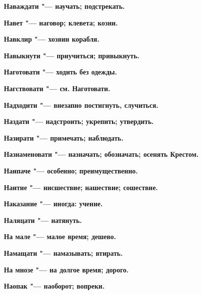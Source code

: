 \begin{multicols}{2}
\bfseries Наваждати\normalfont{} "--- научать; подстрекать. 




\bfseries Навет\normalfont{} "--- наговор; клевета; козни. 




\bfseries Навклир\normalfont{} "--- хозяин корабля. 




\bfseries Навыкнути\normalfont{} "--- приучиться; привыкнуть. 




\bfseries Наготовати\normalfont{} "--- ходить без одежды. 




\bfseries Нагствовати\normalfont{} "--- см. Наготовати. 




\bfseries Надходити\normalfont{} "--- внезапно постигнуть, случиться. 




\bfseries Наздати\normalfont{} "--- надстроить; укрепить; утвердить. 




\bfseries Назирати\normalfont{} "--- примечать; наблюдать. 




\bfseries Назнаменовати\normalfont{} "--- назначать; обозначать; осенять Крестом. 




\bfseries Наипаче\normalfont{} "--- особенно; преимущественно. 




\bfseries Наитие\normalfont{} "--- нисшествие; нашествие; сошествие. 




\bfseries Наказание\normalfont{} "--- иногда: учение. 




\bfseries Наляцати\normalfont{} "--- натянуть. 




\bfseries На мале\normalfont{} "--- малое время; дешево. 




\bfseries Намащати\normalfont{} "--- намазывать; втирать. 




\bfseries На мнозе\normalfont{} "--- на долгое время; дорого. 




\bfseries Наопак\normalfont{} "--- наоборот; вопреки. 





\end{multicols}
